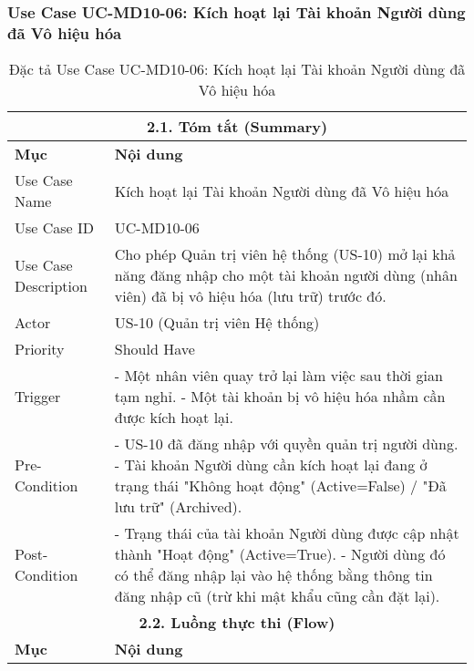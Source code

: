 \subsubsection{Use Case UC-MD10-06: Kích hoạt lại Tài khoản Người dùng đã Vô hiệu hóa}
\begin{longtable}{|m{4cm}|p{11cm}|}
\caption{Đặc tả Use Case UC-MD10-06: Kích hoạt lại Tài khoản Người dùng đã Vô hiệu hóa} \label{tab:uc_md10_06_full_v2_latex_fixed_in_codeblock} \\
\hline
\multicolumn{2}{|c|}{\textbf{2.1. Tóm tắt (Summary)}} \\
\hline
\textbf{Mục} & \textbf{Nội dung} \\
\hline
\endhead %
\midrule
\endfoot %
\bottomrule
\endlastfoot %
Use Case Name & Kích hoạt lại Tài khoản Người dùng đã Vô hiệu hóa \\
\hline
Use Case ID & UC-MD10-06 \\
\hline
Use Case Description & Cho phép Quản trị viên hệ thống (US-10) mở lại khả năng đăng nhập cho một tài khoản người dùng (nhân viên) đã bị vô hiệu hóa (lưu trữ) trước đó. \\
\hline
Actor & US-10 (Quản trị viên Hệ thống) \\
\hline
Priority & Should Have \\
\hline
Trigger & - Một nhân viên quay trở lại làm việc sau thời gian tạm nghỉ. \newline - Một tài khoản bị vô hiệu hóa nhầm cần được kích hoạt lại. \\
\hline
Pre-Condition & - US-10 đã đăng nhập với quyền quản trị người dùng. \newline - Tài khoản Người dùng cần kích hoạt lại đang ở trạng thái "Không hoạt động" (Active=False) / "Đã lưu trữ" (Archived). \\
\hline
Post-Condition & - Trạng thái của tài khoản Người dùng được cập nhật thành "Hoạt động" (Active=True). \newline - Người dùng đó có thể đăng nhập lại vào hệ thống bằng thông tin đăng nhập cũ (trừ khi mật khẩu cũng cần đặt lại). \\
\hline
\multicolumn{2}{|c|}{\textbf{2.2. Luồng thực thi (Flow)}} \\
\hline
\textbf{Mục} & \textbf{Nội dung} \\
\hline

\end{longtable}
